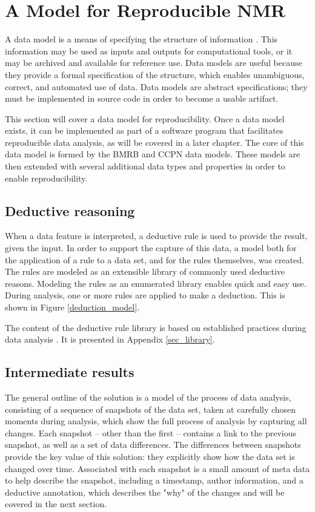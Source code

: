 \section{A Model for Reproducible NMR}

A data model is a means of specifying the structure of information  
\cite{codd1970relational}.  This
information may be used as inputs and outputs for computational tools, or
it may be archived and available for reference use.  Data models are useful
because they provide a formal specification of the structure, which enables
unambiguous, correct, and automated use of data.  Data models are
abstract specifications; they must be implemented in source code in order
to become a usable artifact.

This section will cover a data model for reproducibility.  Once a data
model exists, it can be implemented as part of a software program that
facilitates reproducible data analysis, as will be covered in a later 
chapter.  The core of this data model is formed by the BMRB \cite{bmrb}
and CCPN \cite{ccpn} data models.  These models are then extended with
several additional data types and properties in order to enable 
reproducibility.


\subsection{Deductive reasoning}
When a data feature is interpreted, a deductive rule is used to provide
the result, given the input.  In order to support the capture of this data, 
a model both for the application of a rule to a data set, and for the rules
themselves, was created.  The rules are modeled as an extensible library of 
commonly used deductive reasons.  Modeling the rules as an enumerated library 
enables quick and easy use.  During analysis, one or more rules are applied to 
make a deduction.  This is shown in Figure \ref{deduction_model}.

The content of the deductive rule library is based on 
established practices during data analysis \cite{guerry2011automated, hncacb,
hnco, cbcaconh, hbhaconh, picky, xeasy, sparky, ccpn}.
It is presented in Appendix \ref{sec_library}.



\subsection{Intermediate results}
The general outline of the solution is a model of the process of data analysis,
consisting of a sequence of snapshots of the data set, taken at carefully chosen 
moments during analysis, which show the full process of analysis by capturing
all changes.  Each snapshot -- other than the first -- contains a link to
the previous snapshot, as well as a set of data differences.  The differences
between snapshots provide the key value of this solution: they explicitly
show how the data set is changed over time.
Associated with each snapshot is a small amount of meta data to help describe
the snapshot, including a timestamp, author information, and a deductive
annotation, which describes the "why" of the changes and will be covered in
the next section.

